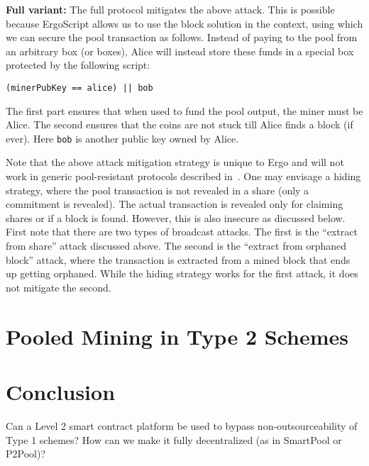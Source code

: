 \documentclass[11pt]{article}
\newcommand{\langname}{ErgoScript\xspace}
\begin{document}
\textbf{Full variant:} The full protocol mitigates the above attack. This is possible because \langname allows us to use the block solution in the context, using which we can secure the pool transaction as follows. Instead of paying to the pool from an arbitrary box (or boxes), Alice will instead store these funds in a special box protected by the following script:
\begin{verbatim}
(minerPubKey == alice) || bob
\end{verbatim}
The first part ensures that when used to fund the pool output, the miner must be Alice. The second ensures that the coins are not stuck till Alice finds a block (if ever). Here \texttt{bob} is another public key owned by Alice.

Note that the above attack mitigation strategy is unique to Ergo and will not work in generic pool-resistant protocols described in~\cite{miller2015nonoutsourceable}. One may envisage a hiding strategy, where the pool transaction is not revealed in a share (only a commitment is revealed). The actual transaction is revealed only for claiming shares or if a block is found. However, this is also insecure as discussed below. First note that there are two types of broadcast attacks. The first is the ``extract from share'' attack discussed above. The second is the ``extract from orphaned block'' attack, where the transaction is extracted from a mined block that ends up getting orphaned. While the hiding strategy works for the first attack, it does not mitigate the second. 

\section{Pooled Mining in Type 2 Schemes}


\section{Conclusion}

Can a Level 2 smart contract platform be used to bypass non-outsourceability of Type 1 schemes? 
How can we make it fully decentralized (as in SmartPool or P2Pool)?



\appendix
\end{document}
